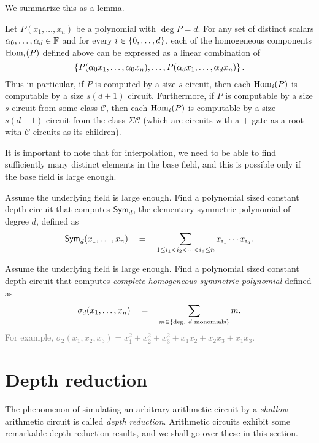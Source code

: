 We summarize this as a lemma. 

\begin{lemma}\label{lem:computing-hom-components}
Let $P(x_1,\ldots, x_n)$ be a polynomial with $\deg P = d$. For any set of distinct scalars $\alpha_0, \ldots, \alpha_{d} \in \mathbb{F}$ and for every $i \in \left\{0,\ldots, d\right\}$,  each of the homogeneous components $\operatorname{Hom}_i(P)$ defined above can be expressed as a linear combination of 
\[
\left\{P(\alpha_0x_1,\ldots, \alpha_0x_n), \ldots, P(\alpha_dx_1,\ldots, \alpha_dx_n)\right\}.
\]
Thus in particular, if $P$ is computed by a size $s$ circuit, then each $\operatorname{Hom}_i(P)$ is computable  by a size $s(d+1)$ circuit. Furthermore, if $P$ is computable by a size $s$ circuit from some class $\mathcal{C}$, then each $\operatorname{Hom}_i(P)$ is computable by a size $s(d+1)$ circuit from the class $\Sigma \mathcal{C}$ (which are circuits with a $+$ gate as a root with $\mathcal{C}$-circuits as its children).
\end{lemma}

It is important to note that for interpolation, we need to be able to find sufficiently many distinct elements in the base field, and this is possible only if the base field is large enough. 

\begin{exercise}\label{ex:ben-or-trick}
Assume the underlying field is large enough. Find a polynomial sized constant depth circuit that computes $\operatorname{\mathsf{Sym}}_d$, the elementary symmetric polynomial of degree $d$, defined as
\[
\operatorname{\mathsf{Sym}}_{d}(x_1,\ldots, x_n) \quad = \quad \sum_{1\leq i_1 < i_2 < \cdots < i_d \leq n} x_{i_1} \cdots x_{i_d}.
\]
\end{exercise}

\begin{exercise}
Assume the underlying field is large enough. Find a polynomial sized constant depth circuit that computes \emph{complete homogeneous symmetric polynomial} defined as
\[
\sigma_d(x_1,\ldots, x_n) \quad = \quad \sum_{m \in \left\{\text{deg. $d$ monomials}\right\}} m.
\]
\textcolor{gray}{For example, $\sigma_2(x_1,x_2,x_3) = x_1^2 + x_2^2 + x_3^2 + x_1x_2 + x_2x_3 + x_1x_3$.}
\end{exercise}


\section{Depth reduction}

The phenomenon of simulating an arbitrary arithmetic circuit by a \emph{shallow} arithmetic circuit is called \emph{depth reduction}. 
Arithmetic circuits exhibit some remarkable depth reduction results, and we shall go over these in this section. 


